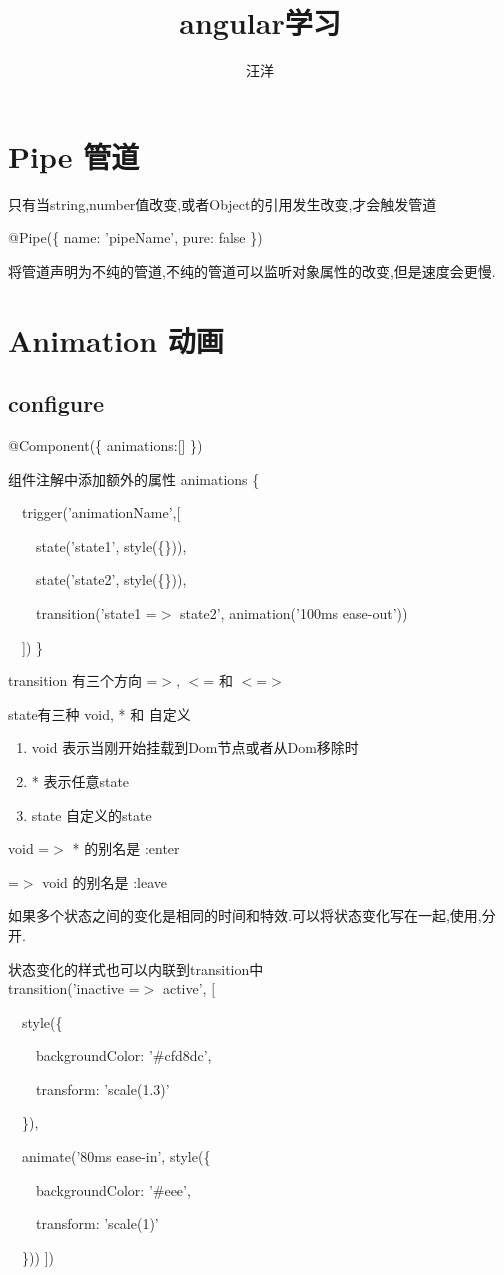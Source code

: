 \documentclass{article}
\title{angular学习}
\author{汪洋}
\begin{document}
\maketitle

\newpage
\tableofcontents
\newpage
 
\section{Pipe 管道}
只有当string,number值改变,或者Object的引用发生改变,才会触发管道


@Pipe(\{
  name: 'pipeName',
  pure: false
\})

将管道声明为不纯的管道,不纯的管道可以监听对象属性的改变,但是速度会更慢.

\section{Animation 动画}
\subsection{configure}
@Component(\{ animations:[] \})
\par 组件注解中添加额外的属性 animations
\{
\par\ \ trigger('animationName',[
\par\ \ \ \ state('state1', style(\{\})),
\par\ \ \ \ state('state2', style(\{\})),
\par\ \ \ \ transition('state1 =$>$ state2', animation('100ms ease-out')) 
\par\ \ ])
\}

transition 有三个方向 =$>$, $<$= 和 $<$=$>$

state有三种 void, * 和 自定义
\begin{enumerate}
\item void 表示当刚开始挂载到Dom节点或者从Dom移除时
\item * 表示任意state
\item state 自定义的state
\end{enumerate}

void =$>$ * 的别名是 :enter
\par * =$>$ void 的别名是 :leave

如果多个状态之间的变化是相同的时间和特效.可以将状态变化写在一起,使用,分开.

状态变化的样式也可以内联到transition中\\
transition('inactive =$>$ active', $[$
\par\ \ style(\{
\par\ \ \ \ backgroundColor: '\#cfd8dc',
\par\ \ \ \ transform: 'scale(1.3)'
\par\ \ \}),
\par\ \ animate('80ms ease-in', style(\{
\par\ \ \ \ backgroundColor: '\#eee',
\par\ \ \ \ transform: 'scale(1)'
\par\ \ \}))
$]$)
\end{document}
